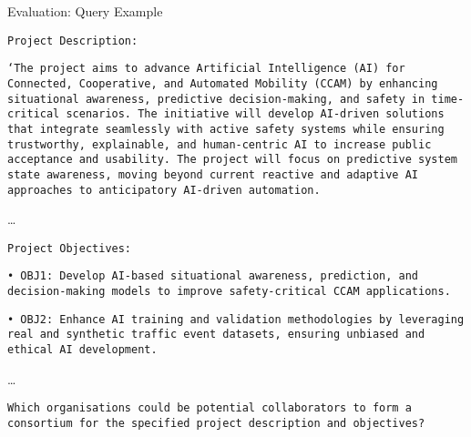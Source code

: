 \begin{frame}{Evaluation: Query Example}


\scriptsize
\texttt{Project Description:}

\texttt{`The project aims to advance Artificial Intelligence (AI) for Connected, Cooperative, and Automated Mobility (CCAM) by enhancing situational awareness, predictive decision-making, and safety in time-critical scenarios.
The initiative will develop AI-driven solutions that integrate seamlessly with active safety systems while ensuring trustworthy, explainable, and human-centric AI to increase public acceptance and usability.
The project will focus on predictive system state awareness, moving beyond current reactive and adaptive AI approaches to anticipatory AI-driven automation.}

\ldots

\texttt{Project Objectives:}

\texttt{• OBJ1: Develop AI-based situational awareness, prediction, and decision-making models to improve safety-critical CCAM applications.}

\texttt{• OBJ2: Enhance AI training and validation methodologies by leveraging real and synthetic traffic event datasets, ensuring unbiased and ethical AI development.}

\ldots

\texttt{Which organisations could be potential collaborators to form a consortium for the specified project description and objectives?}
\end{frame}